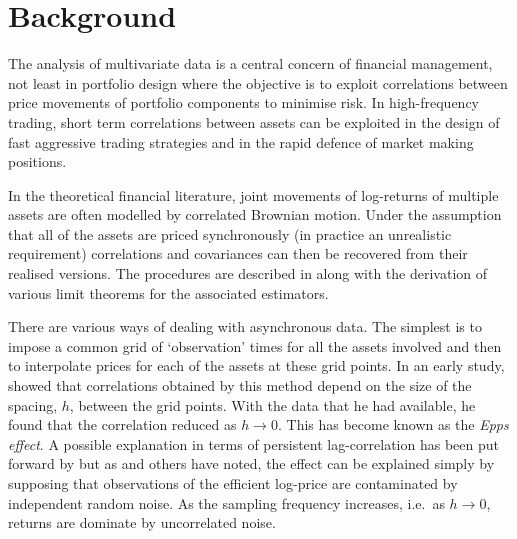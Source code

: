 \section{Background}
The analysis of multivariate data is a central concern of financial management, not least in portfolio design where the objective is to exploit correlations between price movements of portfolio components to minimise risk. In high-frequency trading, short term correlations between assets can be exploited in the design of fast aggressive trading strategies and in the rapid defence of market making positions. 

In the theoretical financial literature, joint movements of log-returns of multiple assets are often modelled by correlated Brownian motion. Under the assumption that all of the assets are priced synchronously (in practice an unrealistic requirement) correlations and covariances can then be recovered from their realised versions. The procedures are described in \citet{barndorff2004econometric} along with the derivation of various limit theorems for the associated estimators.

There are various ways of dealing with asynchronous data. The simplest is to impose a common grid of `observation' times for all the assets involved and then to interpolate prices for each of the assets at these grid points. In an early study, \citet{epps1979comovements} showed that correlations obtained by this method depend on the size of the spacing, $h$, between the grid points. With the data that he had available, he found that the correlation reduced as $h \to 0$.  This has become known as the \emph{Epps effect}. A possible explanation in terms of persistent lag-correlation has been put forward by \citet{toth2009accurate,toth2009epps} but as \citet{zhou1998estimating} and others have noted, the effect can be explained simply by supposing that observations of the efficient log-price are contaminated by independent random noise.  As the sampling frequency increases, i.e.\ as $h \to 0$, returns are dominate by uncorrelated noise.  

